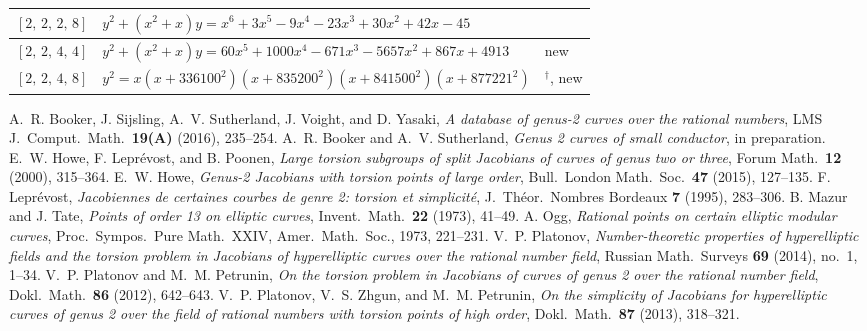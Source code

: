 \documentclass[11pt]{amsart}
\begin{document}
\begin{longtable}{|>{\raggedright\arraybackslash}p{1.7cm}|>{\raggedright\arraybackslash}p{}|>{\raggedright\arraybackslash}p{2.6cm}|}
$[2,\,2,\,2,\,8]$ & \href{https://alpha.lmfdb.org/Genus2Curve/Q/?jump=[[-45,42,30,-23,-9,3,1],[0,1,1]]}{$y^2 + (x^{2}+x)y = x^{6}+3x^{5}-9x^{4}-23x^{3}+30x^{2}+42x-45$} & \cite{BookerSutherland}\\ \hline
$[2,\,2,\,4,\,4]$ & $y^2 + (x^{2}+x)y = 60x^{5}+1000x^{4}-671x^{3}-5657x^{2}+867x+4913$ & new\\ \hline
$[2,\,2,\,4,\,8]$ & $y^2 = x(x+336100^2)(x+835200^2)(x+841500^2)(x+877221^2)$ & \cite{HLP2000}$^\dagger$, new\\ \hline
\end{longtable}
\endgroup

\begin{thebibliography}{99}
 A.~R. Booker, J. Sijsling, A.~V. Sutherland, J. Voight, and D. Yasaki,
\emph{A database of genus-2 curves over the rational numbers},
LMS J.~Comput.\ Math.\ \textbf{19(A)} (2016), 235--254.
 A.~R. Booker and A.~V. Sutherland,
\emph{Genus 2 curves of small conductor}, in preparation.
 E.~W. Howe, F. Lepr\'evost, and B. Poonen, \emph{Large torsion
subgroups of split Jacobians of curves of genus two or three}, Forum Math.\
\textbf{12} (2000), 315--364.
 E.~W. Howe, \emph{Genus-2 Jacobians with torsion points of
large order}, Bull.\ London Math.\ Soc.\ \textbf{47} (2015), 127--135.
\bibitem{Leprevost1995} F. Lepr\'evost, \emph{Jacobiennes de certaines courbes de
genre 2: torsion et simplicit\'e}, J.~Th\'eor.\ Nombres Bordeaux \textbf{7} (1995),
283--306.
 B. Mazur and J. Tate, \emph{Points of order 13 on elliptic
curves}, Invent.\ Math.\ \textbf{22} (1973), 41--49.
 A. Ogg, \emph{Rational points on certain elliptic modular curves},
Proc.\ Sympos.\ Pure Math.\ XXIV, Amer.\ Math.\ Soc., 1973, 221--231.
\bibitem{Platonov2014} V.~P. Platonov, \emph{Number-theoretic properties of
hyperelliptic fields and the torsion problem in Jacobians of hyperelliptic curves
over the rational number field}, Russian Math.\ Surveys \textbf{69} (2014), no.~1,
1--34.
 V.~P. Platonov and M.~M. Petrunin, \emph{On the torsion problem
in Jacobians of curves of genus 2 over the rational number field},
Dokl.\ Math.\ \textbf{86} (2012), 642--643.
 V.~P. Platonov, V.~S. Zhgun, and M.~M. Petrunin,
\emph{On the simplicity of Jacobians for hyperelliptic curves of genus 2 over the
field of rational numbers with torsion points of high order},
Dokl.\ Math.\ \textbf{87} (2013), 318--321.
\end{thebibliography}
\end{document}
